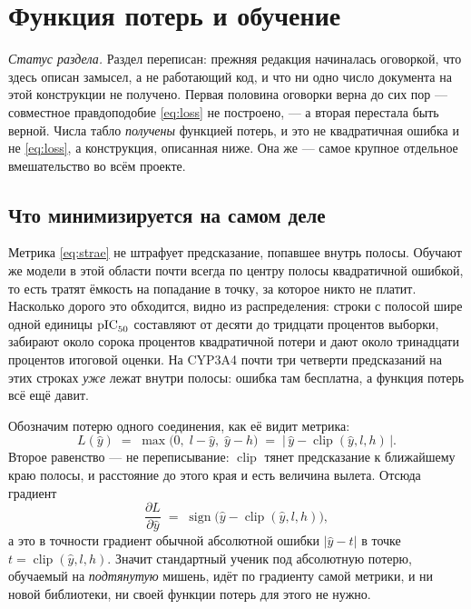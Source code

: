 \section{Функция потерь и обучение}
\label{sec:loss}

\emph{Статус раздела.} Раздел переписан: прежняя редакция начиналась оговоркой, что здесь описан
замысел, а не работающий код, и что ни одно число документа на этой конструкции не получено.
Первая половина оговорки верна до сих пор --- совместное правдоподобие \eqref{eq:loss} не
построено, --- а вторая перестала быть верной. Числа табло \emph{получены} функцией потерь, и это
не квадратичная ошибка и не \eqref{eq:loss}, а конструкция, описанная ниже. Она же --- самое
крупное отдельное вмешательство во всём проекте.

\subsection{Что минимизируется на самом деле}
\label{sec:deadzone}

Метрика \eqref{eq:strae} не штрафует предсказание, попавшее внутрь полосы. Обучают же модели в этой
области почти всегда по центру полосы квадратичной ошибкой, то есть тратят ёмкость на попадание в
точку, за которое никто не платит. Насколько дорого это обходится, видно из распределения: строки с
полосой шире одной единицы $\mathrm{pIC}_{50}$ составляют от десяти до тридцати процентов выборки, забирают
около сорока процентов квадратичной потери и дают около тринадцати процентов итоговой оценки. На
CYP3A4 почти три четверти предсказаний на этих строках \emph{уже} лежат внутри полосы: ошибка там
бесплатна, а функция потерь всё ещё давит.

Обозначим потерю одного соединения, как её видит метрика:
\begin{equation}
L(\hat y) \;=\; \max\bigl(0,\; l - \hat y,\; \hat y - h\bigr)
\;=\; \bigl|\,\hat y - \operatorname{clip}(\hat y, l, h)\,\bigr| .
\label{eq:dead}
\end{equation}
Второе равенство --- не переписывание: $\operatorname{clip}$ тянет предсказание к ближайшему краю
полосы, и расстояние до этого края и есть величина вылета. Отсюда градиент
\begin{equation}
\frac{\partial L}{\partial \hat y}
\;=\; \operatorname{sign}\bigl(\hat y - \operatorname{clip}(\hat y, l, h)\bigr),
\label{eq:deadgrad}
\end{equation}
а это в точности градиент обычной абсолютной ошибки $|\hat y - t|$ в точке
$t = \operatorname{clip}(\hat y, l, h)$. Значит стандартный ученик под абсолютную потерю, обучаемый
на \emph{подтянутую} мишень, идёт по градиенту самой метрики, и ни новой библиотеки, ни своей
функции потерь для этого не нужно.

